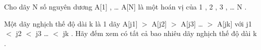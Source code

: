 Cho dãy N số nguyên dương A[1] , … A[N] là một hoán vị của 1 , 2 , 3 , … N .   


   Một dãy nghịch thế độ dài k là 1 dãy A[j1] $>$ A[j2] $>$ A[j3] … $>$ A[jk] với j1 $<$ j2 $<$ j3 … $<$ jk . Hãy đếm xem có tất cả bao nhiêu dãy nghịch thế độ dài k .